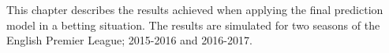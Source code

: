This chapter describes the results achieved when applying the final prediction model in a betting situation. The results are simulated for two seasons of the English Premier League; 2015-2016 and 2016-2017.